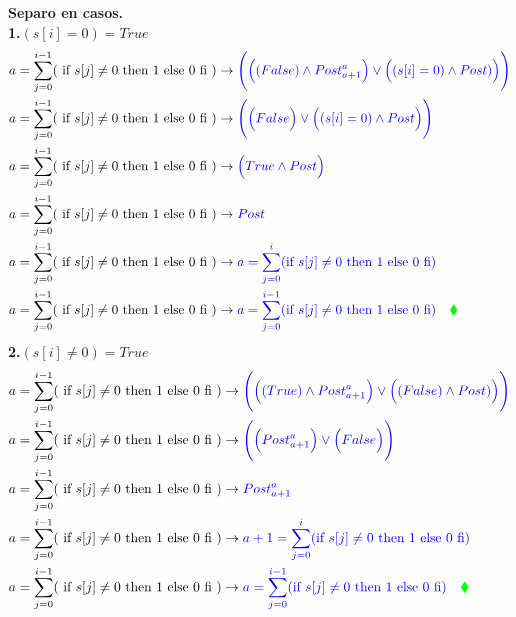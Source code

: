 \documentclass[a4paper]{article}
\begin{document}
\begin{enumerate}
   		\textbf{Separo en casos.}\medskip \\
   		\textbf{1.}$(s[i]=0)=True$
   		\begin{align*}
   		a=\sum_{j=0}^{i-1}(\textrm{ if }s[j] \neq 0 
    \textrm{ then 1 else 0 fi }) &\rightarrow \color{blue} \Bigg(\Big((False)\wedge
   				Post_{a+1}^{a}\Big) \vee \Big((s[i] = 0)\wedge Post)\Big)\Bigg)\\
   		a=\sum_{j=0}^{i-1}(\textrm{ if }s[j] \neq 0 
    \textrm{ then 1 else 0 fi }) &\rightarrow \color{blue} \Bigg(\Big(False\Big) \vee \Big((s[i] = 0)\wedge Post\Big)\Bigg)\\
   		a=\sum_{j=0}^{i-1}(\textrm{ if }s[j] \neq 0 
    \textrm{ then 1 else 0 fi }) &\rightarrow \color{blue} \Big(True\wedge Post\Big)\\
    	a=\sum_{j=0}^{i-1}(\textrm{ if }s[j] \neq 0 
    \textrm{ then 1 else 0 fi }) &\rightarrow \color{blue} Post\\
    	a=\sum_{j=0}^{i-1}(\textrm{ if }s[j] \neq 0 
    \textrm{ then 1 else 0 fi }) &\rightarrow \color{blue} a=\sum_{j=0}^{i}(\textrm{if }s[j] \neq 0
    \textrm{ then 1 else 0 fi})\\
    a=\sum_{j=0}^{i-1}(\textrm{ if }s[j] \neq 0 
    \textrm{ then 1 else 0 fi }) &\rightarrow \color{blue} a=\sum_{j=0}^{i-1}(\textrm{if }s[j] \neq 0
    \textrm{ then 1 else 0 fi})\quad\color{green}\blacklozenge\\
		\end{align*}
\textbf{2.}$(s[i]\neq 0)=True$\\
   		\begin{align*}
   		a=\sum_{j=0}^{i-1}(\textrm{ if }s[j] \neq 0 
    \textrm{ then 1 else 0 fi }) &\rightarrow \color{blue} \Bigg(\Big((True)\wedge
   				Post_{a+1}^{a}\Big) \vee \Big((False)\wedge Post)\Big)\Bigg)\\
   		a=\sum_{j=0}^{i-1}(\textrm{ if }s[j] \neq 0 
    \textrm{ then 1 else 0 fi }) &\rightarrow \color{blue} \Bigg(\Big(Post_{a+1}^{a}\Big) \vee \Big(False\Big)\Bigg)\\
    a=\sum_{j=0}^{i-1}(\textrm{ if }s[j] \neq 0
    \textrm{ then 1 else 0 fi }) &\rightarrow \color{blue} Post_{a+1}^{a}\\
    	a=\sum_{j=0}^{i-1}(\textrm{ if }s[j] \neq 0 
    \textrm{ then 1 else 0 fi }) &\rightarrow \color{blue} a+1=\sum_{j=0}^{i}(\textrm{if }s[j] \neq 0
    \textrm{ then 1 else 0 fi})\\
    a=\sum_{j=0}^{i-1}(\textrm{ if }s[j] \neq 0 
    \textrm{ then 1 else 0 fi }) &\rightarrow \color{blue} a=\sum_{j=0}^{i-1}(\textrm{if }s[j] \neq 0
    \textrm{ then 1 else 0 fi})\quad\color{green}\blacklozenge\\
		\end{align*}
	
\end{enumerate}
\end{document}
